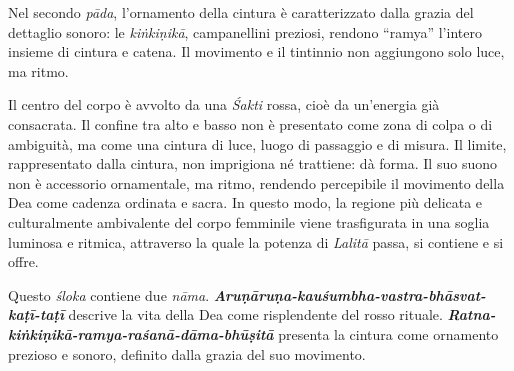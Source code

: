 Nel secondo \textit{pāda}, l’ornamento della cintura è caratterizzato dalla grazia del dettaglio sonoro: le \textit{kiṅkiṇikā}, campanellini preziosi, rendono “ramya” l’intero insieme di cintura e catena. Il movimento e il tintinnio non aggiungono solo luce, ma ritmo.

Il centro del corpo è avvolto da una \textit{Śakti} rossa, cioè da un’energia già consacrata. Il confine tra alto e basso non è presentato come zona di colpa o di ambiguità, ma come una cintura di luce, luogo di passaggio e di misura. Il limite, rappresentato dalla cintura, non imprigiona né trattiene: dà forma. Il suo suono non è accessorio ornamentale, ma ritmo, rendendo percepibile il movimento della Dea come cadenza ordinata e sacra. In questo modo, la regione più delicata e culturalmente ambivalente del corpo femminile viene trasfigurata in una soglia luminosa e ritmica, attraverso la quale la potenza di \textit{Lalitā} passa, si contiene e si offre.

Questo \textit{śloka} contiene due \textit{nāma}.  
\textbf{\textit{Aruṇāruṇa-kauśumbha-vastra-bhāsvat-kaṭī-taṭī}} descrive la vita della Dea come risplendente del rosso rituale.  
\textbf{\textit{Ratna-kiṅkiṇikā-ramya-raśanā-dāma-bhūṣitā}} presenta la cintura come ornamento prezioso e sonoro, definito dalla grazia del suo movimento.
